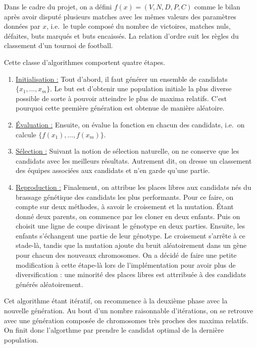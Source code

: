 \documentclass[12pt,a4paper]{article}
\begin{document}
Dans le cadre du projet, on a d\'efini $f(x)=(V,N,D,P,C)$ comme le 
bilan apr\`es avoir disput\'e plusieurs matches avec les m\^emes valeurs des 
param\`etres donn\'ees par $x$, i.e.\ le tuple compos\'e du 
nombre de 
victoires, matches nuls, d\'efaites, buts marqu\'es et buts encaiss\'es. La 
relation d'ordre suit les r\`egles du classement d'un tournoi de football.

Cette classe d'algorithmes comportent quatre \'etapes.

\begin{enumerate}
\item \underline{Initialisation :} Tout d'abord, il faut g\'en\'erer un 
ensemble de candidats $\{x_1,\dotsc,x_m\}$. Le but est d'obtenir une population 
initiale la plus diverse possible de sorte \`a pouvoir atteindre le plus de 
maxima relatifs. C'est pourquoi cette premi\`ere g\'en\'eration est obtenue de 
mani\`ere al\'eatoire.
\item \underline{\'Evaluation :} Ensuite, on \'evalue la fonction en 
chacun des candidats, i.e.\ on calcule $\{f(x_1),\dotsc,f(x_m)\}$.
\item \underline{S\'election :} Suivant la notion de s\'election 
naturelle, on ne conserve que les candidats avec les meilleurs r\'esultats. 
Autrement dit, on dresse un classement des \'equipes associ\'ees aux candidats 
et n'en garde qu'une partie.
\item \underline{Reproduction :} Finalement, on attribue les places 
libres aux candidats n\'es du brassage g\'en\'etique des candidats les 
plus performants. Pour ce faire, on compte sur deux m\'ethodes, \`a savoir le 
croisement et la mutation. \'Etant donn\'e deux parents, on commence par les 
cloner en deux enfants. Puis on choisit une ligne de coupe divisant le 
g\'enotype en deux parties. Ensuite, les enfants s'\'echangent une partie de 
leur g\'enotype. Le croisement s'arr\^ete \`a ce stade-l\`a, tandis que la 
mutation ajoute du bruit al\'eatoirement dans un g\`ene pour chacun 
des nouveaux chromosomes. On a d\'ecid\'e de faire une petite modification \`a 
cette \'etape-l\`a lors de l'impl\'ementation pour avoir plus de 
diversification : une minorit\'e des places libres est attrribu\'ee \`a des 
candidats g\'en\'er\'es al\'eatoirement.
\end{enumerate}

Cet algorithme \'etant it\'eratif, on recommence \`a la deuxi\`eme phase avec 
la nouvelle g\'en\'eration. Au bout d'un nombre raisonnable d'it\'erations, on 
se retrouve avec une g\'en\'eration compos\'ee de chromosomes tr\`es proches des 
maxima relatifs. On finit donc l'algorthme par prendre le candidat optimal de la 
derni\`ere population.  
\end{document}
